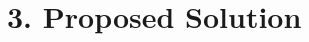 \documentclass[11pt, a4paper, twoside, openright]{report}
\begin{document}




%
%
%
%


\section*{3. Proposed Solution}

\end{document}
